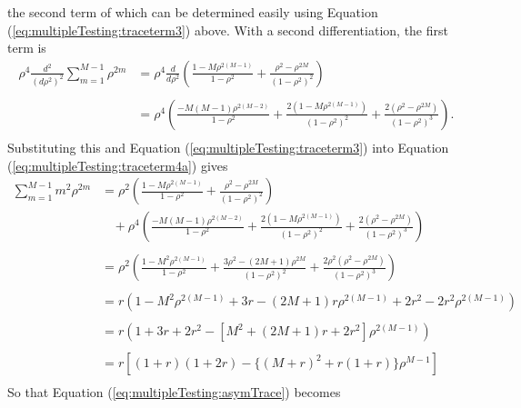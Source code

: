 \documentclass[letterpaper,12pt,oneside,final]{article}
\begin{document}
the second term of which can be determined easily using Equation (\ref{eq:multipleTesting:traceterm3}) above. With a second differentiation, the first term is
\begin{equation*}
  \begin{aligned}
    \rho^4 \frac{d^2}{(d\rho^2)^2} \sum_{m = 1}^{M-1} \rho^{2m} & = \rho^4 \frac{d}{d\rho^2} \left ( \frac{1 - M\rho^{2(M-1)}}{1 - \rho^2} + \frac{\rho^2 - \rho^{2M}}{(1 - \rho^2)^2} \right ) \\
    & \\
    & = \rho^4 \left ( \frac{ - M(M-1) \rho^{2(M-2)}}{1 - \rho^2} + \frac{2(1 - M \rho^{2(M-1)})}{(1 - \rho^2)^2} + \frac{2(\rho^2 - \rho^{2M})}{(1 - \rho^2)^3} \right ). \\
  \end{aligned}
\end{equation*}
Substituting this and Equation (\ref{eq:multipleTesting:traceterm3}) into Equation (\ref{eq:multipleTesting:traceterm4a}) gives
\begin{equation} \label{eq:multipleTesting:traceterm4}
  \begin{aligned}
    \sum_{m = 1}^{M-1} m^2 \rho^{2m} & =  \rho^2 \left ( \frac{1 - M\rho^{2(M-1)}}{1 - \rho^2} + \frac{\rho^2 - \rho^{2M}}{(1 - \rho^2)^2} \right ) \\
    & ~~~~ + \rho^4 \left ( \frac{ - M(M-1) \rho^{2(M-2)}}{1 - \rho^2} + \frac{2(1 - M \rho^{2(M-1)})}{(1 - \rho^2)^2} + \frac{2(\rho^2 - \rho^{2M})}{(1 - \rho^2)^3} \right ) \\
    & \\
    & = \rho^2 \left ( \frac{1 - M^2 \rho^{2(M-1)}}{1 - \rho^2} + \frac{3\rho^2 - (2M + 1) \rho^{2M}}{(1 - \rho^2)^2} + \frac{2\rho^2(\rho^2 - \rho^{2M})}{(1 - \rho^2)^3} \right ) \\
    & \\
    & = r \left ( 1 - M^2 \rho^{2(M-1)} + 3r - (2M + 1)r \rho^{2(M-1)} + 2r^2 - 2r^2 \rho^{2(M-1)} \right ) \\
    & \\
    & = r \left ( 1 + 3r + 2r^2 - [M^2 + (2M + 1)r + 2r^2] \rho^{2(M-1)} \right ) \\
    & \\
    & = r \left [ (1 + r)(1 + 2r) - \{ (M + r)^2 + r(1 + r) \} \rho^{M-1} \right ] \\
  \end{aligned}
\end{equation}
So that Equation (\ref{eq:multipleTesting:asymTrace}) becomes
\end{document}
